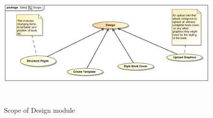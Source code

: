 \documentclass[12pt]{article}
\begin{document}
\begin{figure}[h]
\includegraphics[height=250px, width=500px]{epsImages/Design/Scope.eps}
\caption{Scope of Design module}
\end{figure}
\end{document}
